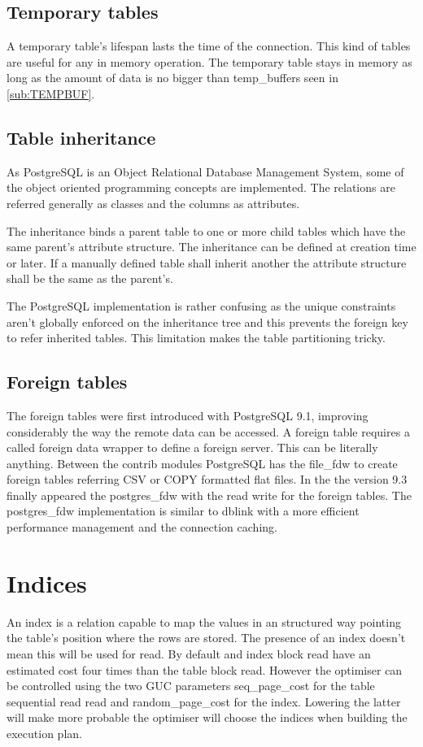 \subsection{Temporary tables}
A temporary table's lifespan lasts the time of the connection. This kind of 
tables are useful for any in memory operation. The temporary table stays in 
memory as long as the amount of data is no bigger than 
temp\_buffers seen in \ref{sub:TEMPBUF}. 

\subsection{Table inheritance}
As PostgreSQL is an Object Relational Database Management System, some of the 
object oriented programming concepts are implemented. The relations are 
referred generally as classes and the columns as attributes. 

The inheritance binds a parent table to one or more child tables which have 
the same parent's attribute structure. The inheritance can be defined at 
creation time or later. If a manually defined table shall inherit another the 
attribute structure shall be the same as the parent's.

The PostgreSQL implementation is rather confusing as the unique constraints 
aren't globally enforced on the inheritance tree and this prevents the foreign 
key to refer inherited tables. This limitation makes the table 
partitioning tricky.

\subsection{Foreign tables}
The foreign tables were first introduced with PostgreSQL 9.1, improving 
considerably the way the remote data can be accessed. 
A foreign table requires a called foreign data wrapper to define a foreign 
server. This can be literally anything. Between the contrib modules PostgreSQL 
has the file\_fdw to create foreign tables referring CSV or COPY formatted flat 
files. In the the version 9.3 finally appeared the postgres\_fdw with the read 
write for the foreign tables. The postgres\_fdw implementation is similar to 
dblink with a more efficient performance management and the connection caching.


\section{Indices}
An index is a relation capable to map the values in an structured way pointing
the table's position where the rows are stored. The presence of an index 
doesn't mean this will be used for read. By default and index block read have 
an estimated cost four times than the table block read. However the optimiser
can be controlled using the two GUC parameters seq\_page\_cost for the table 
 sequential read read and random\_page\_cost for the index. Lowering the latter 
will make more probable the optimiser will choose the indices when building the 
execution plan.

